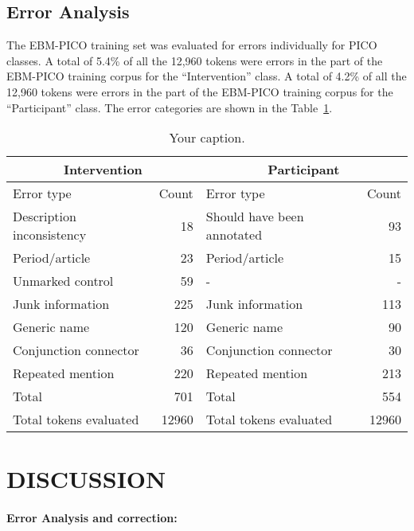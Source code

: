 \documentclass[10.7pt,]{article}
\let\oldparagraph\paragraph
\renewcommand{\paragraph}[1]{\oldparagraph{#1}\mbox{}}
\begin{document}
\subsection{Error Analysis}\label{subsec:err}
%
The EBM-PICO training set was evaluated for errors individually for PICO classes.
A total of 5.4\% of all the 12,960 tokens were errors in the part of the EBM-PICO training corpus for the ``Intervention'' class.
A total of 4.2\% of all the 12,960 tokens were errors in the part of the EBM-PICO training corpus for the ``Participant'' class.
The error categories are shown in the Table~\ref{tab:errordist}.


\begin{table}[!ht]
    \centering
    \begin{tabular}{|l|r|l|r|}
    \hline
    \multicolumn{2}{|c|}{Intervention} & \multicolumn{2}{|c|}{Participant} \\
    \hline
    Error type & Count & Error type & Count\\
    \hline
        Description inconsistency & 18 & Should have been annotated & 93 \\
        Period/article & 23 & Period/article & 15 \\ 
        Unmarked control & 59 & - & - \\ 
        Junk information & 225 & Junk information & 113 \\ 
        Generic name & 120 & Generic name & 90 \\ 
        Conjunction connector & 36 & Conjunction connector & 30 \\ 
        Repeated mention & 220 & Repeated mention & 213 \\ 
        Total & 701 & Total & 554 \\ 
        Total tokens evaluated & 12960 & Total tokens evaluated & 12960 \\ \hline
    \end{tabular}
    \caption{\label{tab:errordist} Your caption.}
\end{table}
%
%
%
\section{DISCUSSION}\label{discussion}
%
\paragraph{Error Analysis and correction: } 
\end{document}

